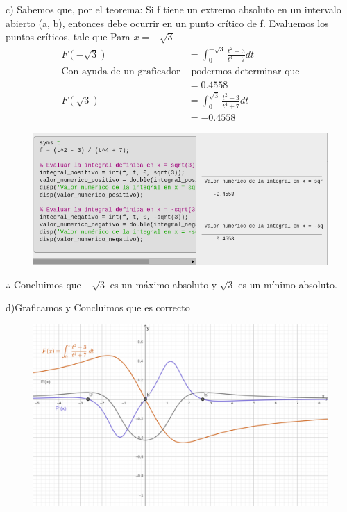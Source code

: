 c) Sabemos que, por el teorema: Si f tiene un extremo absoluto en un intervalo abierto (a, b), entonces debe ocurrir en un punto crítico de f.
Evaluemos los puntos críticos, tale que
Para $x=-\sqrt{3}$
\begin{align*}
	F(-\sqrt{3})                      & =\int_{0}^{-\sqrt{3}}\frac{t^2-3}{t^4+7}dt \\
	\text{Con ayuda de un graficador} & \text{ podermos determinar que}            \\
	                                  & =0.4558                                    \\
	F(\sqrt{3})                       & =\int_{0}^{\sqrt{3}}\frac{t^2-3}{t^4+7}dt  \\
	                                  & =-0.4558
\end{align*}
\begin{figure}[!hbt]
	\includegraphics[height = 0.25\textheight]{recursos/ejercicio56.png}\par
\end{figure}
$\therefore$ Concluimos que  $-\sqrt{3}$ es un máximo absoluto y $\sqrt{3}$ es un mínimo absoluto.

\newpage
d)Graficamos y Concluimos que es correcto
\begin{figure}[!hbt]
	\centering
	\includegraphics[height = 0.40\textheight]{recursos/ejercicio56_1.png}\par
\end{figure}